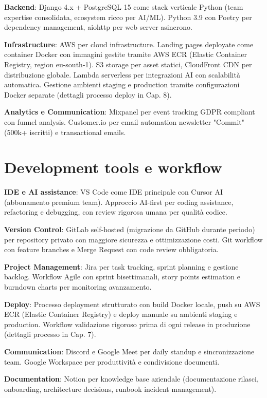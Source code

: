 \textbf{Backend}: Django 4.x + PostgreSQL 15 come stack verticale Python (team expertise consolidata, ecosystem ricco per AI/ML). Python 3.9 con Poetry per dependency management, aiohttp per web server asincrono.

\textbf{Infrastructure}: AWS per cloud infrastructure. Landing pages deployate come container Docker con immagini gestite tramite AWS ECR (Elastic Container Registry, region eu-south-1). S3 storage per asset statici, CloudFront CDN per distribuzione globale. Lambda serverless per integrazioni AI con scalabilità automatica. Gestione ambienti staging e production tramite configurazioni Docker separate (dettagli processo deploy in Cap. 8).

\textbf{Analytics e Communication}: Mixpanel per event tracking GDPR compliant con funnel analysis. Customer.io per email automation newsletter "Commit" (500k+ iscritti) e transactional emails.

\section{Development tools e workflow}

\textbf{IDE e AI assistance}: VS Code come IDE principale con Cursor AI (abbonamento premium team). Approccio AI-first per coding assistance, refactoring e debugging, con review rigorosa umana per qualità codice.

\textbf{Version Control}: GitLab self-hosted (migrazione da GitHub durante periodo) per repository privato con maggiore sicurezza e ottimizzazione costi. Git workflow con feature branches e Merge Request con code review obbligatoria.

\textbf{Project Management}: Jira per task tracking, sprint planning e gestione backlog. Workflow Agile con sprint bisettimanali, story points estimation e burndown charts per monitoring avanzamento.

\textbf{Deploy}: Processo deployment strutturato con build Docker locale, push 
su AWS ECR (Elastic Container Registry) e deploy manuale su ambienti staging e 
production. Workflow validazione rigoroso prima di ogni release in produzione 
(dettagli processo in Cap. 7).

\textbf{Communication}: Discord e Google Meet per daily standup e sincronizzazione team. Google Workspace per produttività e condivisione documenti.

\textbf{Documentation}: Notion per knowledge base aziendale (documentazione rilasci, onboarding, architecture decisions, runbook incident management).